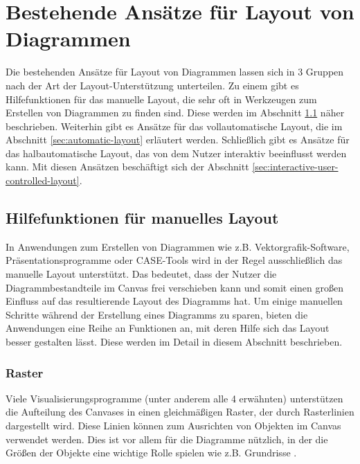 
\chapter{Bestehende Ansätze für Layout von Diagrammen}

Die bestehenden Ansätze für Layout von Diagrammen lassen sich in 3 Gruppen nach der Art der Layout-Unterstützung unterteilen. Zu einem gibt es Hilfefunktionen für das manuelle Layout, die sehr oft in Werkzeugen zum Erstellen von Diagrammen zu finden sind. Diese werden im Abschnitt \ref{sec:manual-layout} näher beschrieben. Weiterhin gibt es Ansätze für das vollautomatische Layout, die im Abschnitt \ref{sec:automatic-layout} erläutert werden. Schließlich gibt es Ansätze für das halbautomatische Layout, das von dem Nutzer interaktiv beeinflusst werden kann. Mit diesen Ansätzen beschäftigt sich der Abschnitt \ref{sec:interactive-user-controlled-layout}.

\section{Hilfefunktionen für manuelles Layout}
\label{sec:manual-layout}

In Anwendungen zum Erstellen von Diagrammen wie z.B. Vektorgrafik-Software, Präsentationsprogramme oder CASE-Tools wird in der Regel ausschließlich das manuelle Layout unterstützt. Das bedeutet, dass der Nutzer die Diagrammbestandteile im Canvas frei verschieben kann und somit einen großen Einfluss auf das resultierende Layout des Diagramms hat. Um einige manuellen Schritte während der Erstellung eines Diagramms zu sparen, bieten die Anwendungen eine Reihe an Funktionen an, mit deren Hilfe sich das Layout besser gestalten lässt. Diese werden im Detail in diesem Abschnitt beschrieben.



\subsection{Raster}
\label{sec:grid}

Viele Visualisierungsprogramme (unter anderem alle 4 erwähnten) unterstützen die Aufteilung des Canvases in einen gleichmäßigen Raster, der durch Rasterlinien dargestellt wird. Diese Linien können zum Ausrichten von Objekten im Canvas verwendet werden. Dies ist vor allem für die Diagramme nützlich, in der die Größen der Objekte eine wichtige Rolle spielen wie z.B. Grundrisse \cite{08OmniGraffle, Olsen10OmniGraffle, 11Keynote, 14Visual}.

